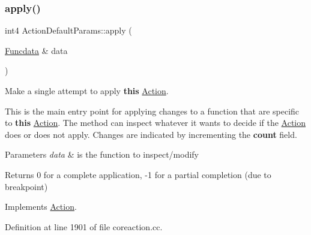 \subsubsection{\texorpdfstring{apply()}{apply()}}
{\footnotesize\ttfamily int4 Action\+Default\+Params\+::apply (\begin{DoxyParamCaption}\item[{\mbox{\hyperlink{class_funcdata}{Funcdata}} \&}]{data }\end{DoxyParamCaption})\hspace{0.3cm}{\ttfamily [virtual]}}



Make a single attempt to apply {\bfseries{this}} \mbox{\hyperlink{class_action}{Action}}. 

This is the main entry point for applying changes to a function that are specific to {\bfseries{this}} \mbox{\hyperlink{class_action}{Action}}. The method can inspect whatever it wants to decide if the \mbox{\hyperlink{class_action}{Action}} does or does not apply. Changes are indicated by incrementing the {\bfseries{count}} field. 
\begin{DoxyParams}{Parameters}
{\em data} & is the function to inspect/modify \\
\hline
\end{DoxyParams}
\begin{DoxyReturn}{Returns}
0 for a complete application, -\/1 for a partial completion (due to breakpoint) 
\end{DoxyReturn}


Implements \mbox{\hyperlink{class_action_aac1c3999d6c685b15f5d9765a4d04173}{Action}}.



Definition at line 1901 of file coreaction.\+cc.

